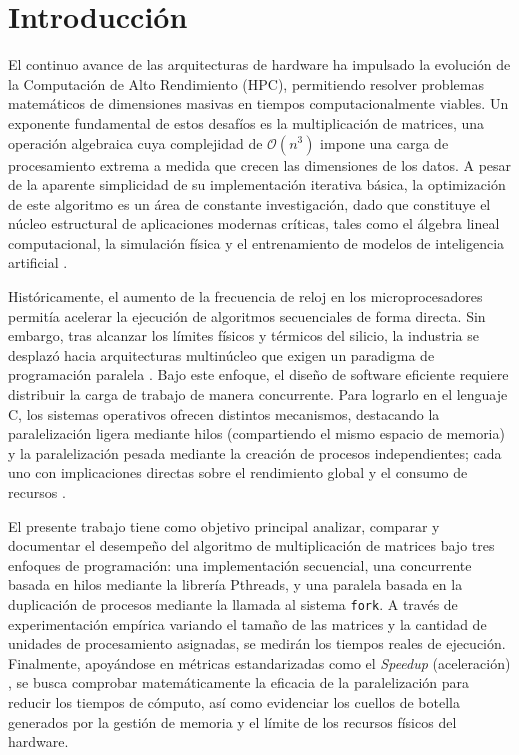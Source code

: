 \section{Introducción}

El continuo avance de las arquitecturas de hardware ha impulsado la evolución de la Computación de Alto Rendimiento (HPC), permitiendo resolver problemas matemáticos de dimensiones masivas en tiempos computacionalmente viables. Un exponente fundamental de estos desafíos es la multiplicación de matrices, una operación algebraica cuya complejidad de \(\mathcal{O}(n^3)\) impone una carga de procesamiento extrema a medida que crecen las dimensiones de los datos. A pesar de la aparente simplicidad de su implementación iterativa básica, la optimización de este algoritmo es un área de constante investigación, dado que constituye el núcleo estructural de aplicaciones modernas críticas, tales como el álgebra lineal computacional, la simulación física y el entrenamiento de modelos de inteligencia artificial \parencite{Dongarra1990BLAS}.

Históricamente, el aumento de la frecuencia de reloj en los microprocesadores permitía acelerar la ejecución de algoritmos secuenciales de forma directa. Sin embargo, tras alcanzar los límites físicos y térmicos del silicio, la industria se desplazó hacia arquitecturas multinúcleo que exigen un paradigma de programación paralela \parencite{Patterson2017Computer}. Bajo este enfoque, el diseño de software eficiente requiere distribuir la carga de trabajo de manera concurrente. Para lograrlo en el lenguaje C, los sistemas operativos ofrecen distintos mecanismos, destacando la paralelización ligera mediante hilos (compartiendo el mismo espacio de memoria) y la paralelización pesada mediante la creación de procesos independientes; cada uno con implicaciones directas sobre el rendimiento global y el consumo de recursos \parencite{Silberschatz2018Operating}.

El presente trabajo tiene como objetivo principal analizar, comparar y documentar el desempeño del algoritmo de multiplicación de matrices bajo tres enfoques de programación: una implementación secuencial, una concurrente basada en hilos mediante la librería Pthreads, y una paralela basada en la duplicación de procesos mediante la llamada al sistema \texttt{fork}. A través de experimentación empírica variando el tamaño de las matrices y la cantidad de unidades de procesamiento asignadas, se medirán los tiempos reales de ejecución. Finalmente, apoyándose en métricas estandarizadas como el \textit{Speedup} (aceleración) \parencite{Hager2010HPC}, se busca comprobar matemáticamente la eficacia de la paralelización para reducir los tiempos de cómputo, así como evidenciar los cuellos de botella generados por la gestión de memoria y el límite de los recursos físicos del hardware.

